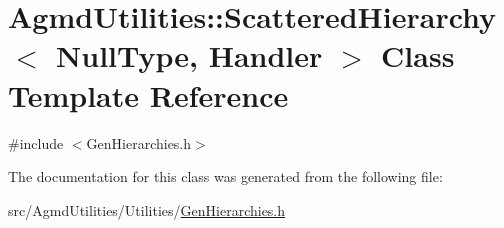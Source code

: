 \hypertarget{class_agmd_utilities_1_1_scattered_hierarchy_3_01_null_type_00_01_handler_01_4}{\section{Agmd\+Utilities\+:\+:Scattered\+Hierarchy$<$ Null\+Type, Handler $>$ Class Template Reference}
\label{class_agmd_utilities_1_1_scattered_hierarchy_3_01_null_type_00_01_handler_01_4}
}


{\ttfamily \#include $<$Gen\+Hierarchies.\+h$>$}



The documentation for this class was generated from the following file\+:\begin{DoxyCompactItemize}
\item 
src/\+Agmd\+Utilities/\+Utilities/\hyperlink{_gen_hierarchies_8h}{Gen\+Hierarchies.\+h}\end{DoxyCompactItemize}

